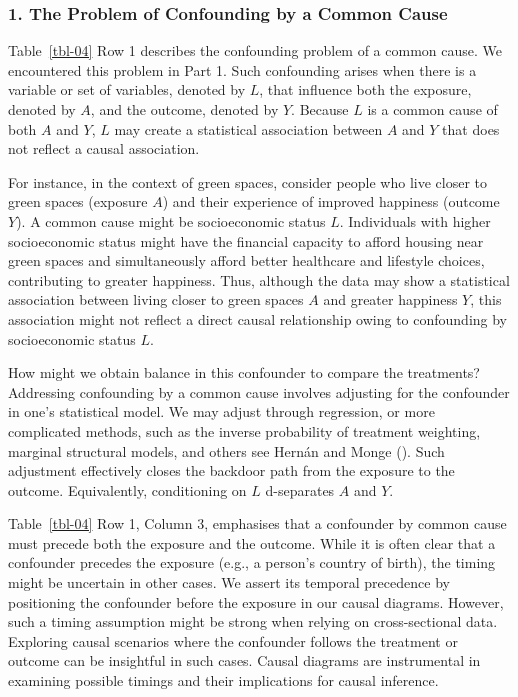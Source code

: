 \documentclass[
  singlecolumn]{article}
\begin{document}
\subsubsection{1. The Problem of Confounding by a Common
Cause}\label{the-problem-of-confounding-by-a-common-cause}

Table~\ref{tbl-04} Row 1 describes the confounding problem of a common
cause. We encountered this problem in Part 1. Such confounding arises
when there is a variable or set of variables, denoted by \(L\), that
influence both the exposure, denoted by \(A\), and the outcome, denoted
by \(Y.\) Because \(L\) is a common cause of both \(A\) and \(Y\), \(L\)
may create a statistical association between \(A\) and \(Y\) that does
not reflect a causal association.

For instance, in the context of green spaces, consider people who live
closer to green spaces (exposure \(A\)) and their experience of improved
happiness (outcome \(Y\)). A common cause might be socioeconomic status
\(L\). Individuals with higher socioeconomic status might have the
financial capacity to afford housing near green spaces and
simultaneously afford better healthcare and lifestyle choices,
contributing to greater happiness. Thus, although the data may show a
statistical association between living closer to green spaces \(A\) and
greater happiness \(Y\), this association might not reflect a direct
causal relationship owing to confounding by socioeconomic status \(L\).

How might we obtain balance in this confounder to compare the
treatments? Addressing confounding by a common cause involves adjusting
for the confounder in one's statistical model. We may adjust through
regression, or more complicated methods, such as the inverse probability
of treatment weighting, marginal structural models, and others see
Hernán and Monge (). Such adjustment
effectively closes the backdoor path from the exposure to the outcome.
Equivalently, conditioning on \(L\) d-separates \(A\) and \(Y\).

Table~\ref{tbl-04} Row 1, Column 3, emphasises that a confounder by
common cause must precede both the exposure and the outcome. While it is
often clear that a confounder precedes the exposure (e.g., a person's
country of birth), the timing might be uncertain in other cases. We
assert its temporal precedence by positioning the confounder before the
exposure in our causal diagrams. However, such a timing assumption might
be strong when relying on cross-sectional data. Exploring causal
scenarios where the confounder follows the treatment or outcome can be
insightful in such cases. Causal diagrams are instrumental in examining
possible timings and their implications for causal inference.
\end{document}
